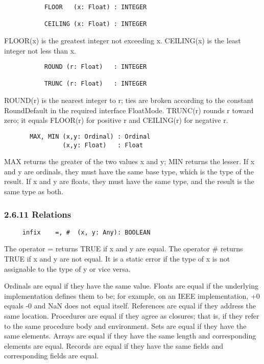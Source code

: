 \documentclass[10pt]{article}
\begin{document}
  
\begin{verbatim}
           FLOOR   (x: Float) : INTEGER

           CEILING (x: Float) : INTEGER
\end{verbatim}
  FLOOR(x) is the greatest integer not exceeding x. CEILING(x) is the least integer not less than x. 


  
\begin{verbatim}
           ROUND (r: Float)   : INTEGER

           TRUNC (r: Float)   : INTEGER
\end{verbatim}
  ROUND(r) is the nearest integer to r; ties are broken according to the constant RoundDefault in the required interface FloatMode. TRUNC(r) rounds r toward zero; it equals FLOOR(r) for positive r and CEILING(r) for negative r. 


  
\begin{verbatim}
       MAX, MIN (x,y: Ordinal) : Ordinal
                (x,y: Float)   : Float
\end{verbatim}
  MAX returns the greater of the two values x and y; MIN returns the lesser. If x and y are ordinals, they must have the same base type, which is the type of the result. If x and y are floats, they must have the same type, and the result is the same type as both. 


 
\subsubsection*{2.6.11 Relations}


 
\begin{verbatim}
     infix    =, #  (x, y: Any): BOOLEAN
\end{verbatim}
 The operator = returns TRUE if x and y are equal. The operator \# returns TRUE if x and y are not equal. It is a static error if the type of x is not assignable to the type of y or vice versa. 


  Ordinals are equal if they have the same value. Floats are equal if the underlying implementation defines them to be; for example, on an IEEE implementation, +0 equals -0 and NaN does not equal itself. References are equal if they address the same location. Procedures are equal if they agree as closures; that is, if they refer to the same procedure body and environment. Sets are equal if they have the same elements. Arrays are equal if they have the same length and corresponding elements are equal. Records are equal if they have the same fields and corresponding fields are equal. 
\end{document}
